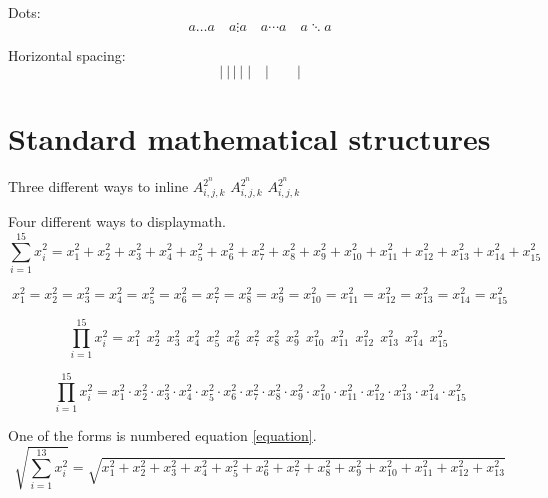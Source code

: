 Dots:
\begin{dmath}[compact,spread={1.250000\baselineskip}] a \ldots a \quad a \vdots a \quad  a \cdots a \quad  a \ddots a \end{dmath}

Horizontal spacing:
\begin{dmath}[compact,spread={1.250000\baselineskip}] |~|\,|\:|\;|\quad | \qquad | \end{dmath}%

\section{Standard mathematical structures}

Three different ways to inline \begin{math}A_{i,j,k}^{2^n}\end{math} \(A_{i,j,k}^{2^n}\) \(A_{i,j,k}^{2^n}\)

Four different ways to displaymath.
\setcounter{equation}{99}
\begin{dmath}[compact,spread={1.250000\baselineskip},label=equation] \sum_{i=1}^{15} x_i^2 = x_1^2 + x_2^2 + x_3^2 + x_4^2 + x_5^2 + x_6^2 + x_7^2 + x_8^2 + x_9^2 + x_{10}^2 + x_{11}^2 + x_{12}^2 + x_{13}^2 + x_{14}^2 + x_{15}^2  \end{dmath}

\begin{dmath*}[compact,spread={1.250000\baselineskip}] x_1^2 = x_2^2 = x_3^2 = x_4^2 = x_5^2 = x_6^2 = x_7^2 = x_8^2 = x_9^2 = x_{10}^2 = x_{11}^2 = x_{12}^2 = x_{13}^2 = x_{14}^2 = x_{15}^2  \end{dmath*}

\begin{dmath*}[compact,spread={1.250000\baselineskip}]
\prod_{i=1}^{15} x_i^2 = x_1^2\ \ x_2^2\ \ x_3^2\ \ x_4^2\ \ x_5^2\ \ x_6^2\ \ x_7^2\ \ x_8^2\ \ x_9^2\ \ x_{10}^2\ \ x_{11}^2\ \ x_{12}^2\ \ x_{13}^2\ \ x_{14}^2\ \ x_{15}^2\ 
\end{dmath*}

\begin{dmath*}[compact,spread={1.250000\baselineskip}]
\prod_{i=1}^{15} x_i^2 = x_1^2 \cdot x_2^2 \cdot x_3^2 \cdot x_4^2 \cdot x_5^2 \cdot x_6^2 \cdot x_7^2 \cdot x_8^2 \cdot x_9^2 \cdot x_{10}^2 \cdot x_{11}^2 \cdot x_{12}^2 \cdot x_{13}^2 \cdot x_{14}^2 \cdot x_{15}^2 
\end{dmath*}

One of the forms is numbered equation \ref{equation}.
\begin{dmath*}[compact,spread={1.250000\baselineskip}]
\sqrt{\sum_{i=1}^{13} x_i^2} = \sqrt{x_1^2 + x_2^2 + x_3^2 + x_4^2 + x_5^2 + x_6^2 + x_7^2 + x_8^2 + x_9^2 + x_{10}^2+ x_{11}^2 + x_{12}^2 + x_{13}^2 }
\end{dmath*}

